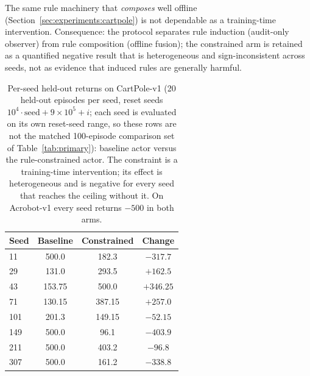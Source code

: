 \documentclass[11pt]{article}
\begin{document}
The same rule machinery that \emph{composes} well offline (Section~\ref{sec:experiments:cartpole}) is
not dependable as a training-time intervention. Consequence: the protocol separates rule induction
(audit-only observer) from rule composition (offline fusion); the constrained arm is retained as a
quantified negative result that is heterogeneous and sign-inconsistent across seeds, not as evidence
that induced rules are generally harmful.

\begin{table}[t]
\centering
\caption{Per-seed held-out returns on CartPole-v1 (20 held-out episodes per seed, reset seeds
$10^{4}\!\cdot\!\text{seed}+9\!\times\!10^{5}+i$; each seed is evaluated on its own reset-seed range,
so these rows are not the matched 100-episode comparison set of Table~\ref{tab:primary}): baseline
actor versus
the rule-constrained actor. The constraint is a training-time intervention; its effect is
heterogeneous and is negative for every seed that reaches the ceiling without it. On Acrobot-v1
every seed returns $-500$ in both arms.}
\label{tab:perseed}
\begin{tabular}{lccc}
\toprule
Seed & Baseline & Constrained & Change \\
\midrule
11 & 500.0 & 182.3 & $-317.7$ \\
29 & 131.0 & 293.5 & $+162.5$ \\
43 & 153.75 & 500.0 & $+346.25$ \\
71 & 130.15 & 387.15 & $+257.0$ \\
101 & 201.3 & 149.15 & $-52.15$ \\
149 & 500.0 & 96.1 & $-403.9$ \\
211 & 500.0 & 403.2 & $-96.8$ \\
307 & 500.0 & 161.2 & $-338.8$ \\
\bottomrule
\end{tabular}
\end{table}
\end{document}
